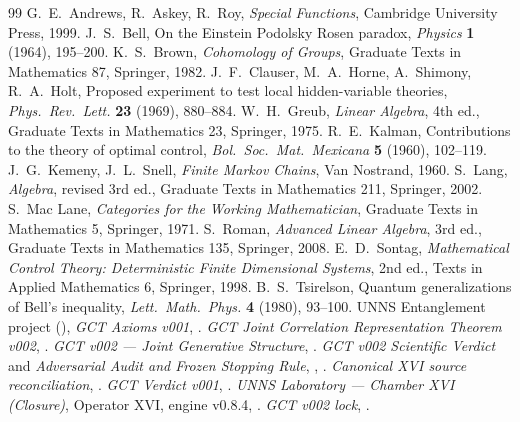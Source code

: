 \documentclass[11pt,a4paper]{article}
\theoremstyle{plain}
\theoremstyle{definition}
\begin{document}
\begin{thebibliography}{99}\small
 G.~E.~Andrews, R.~Askey, R.~Roy, \emph{Special Functions}, Cambridge University Press, 1999.
 J.~S.~Bell, On the Einstein Podolsky Rosen paradox, \emph{Physics} \textbf{1} (1964), 195--200.
 K.~S.~Brown, \emph{Cohomology of Groups}, Graduate Texts in Mathematics 87, Springer, 1982.
 J.~F.~Clauser, M.~A.~Horne, A.~Shimony, R.~A.~Holt, Proposed experiment to test local hidden-variable theories, \emph{Phys.\ Rev.\ Lett.} \textbf{23} (1969), 880--884.
 W.~H.~Greub, \emph{Linear Algebra}, 4th ed., Graduate Texts in Mathematics 23, Springer, 1975.
 R.~E.~Kalman, Contributions to the theory of optimal control, \emph{Bol.\ Soc.\ Mat.\ Mexicana} \textbf{5} (1960), 102--119.
 J.~G.~Kemeny, J.~L.~Snell, \emph{Finite Markov Chains}, Van Nostrand, 1960.
 S.~Lang, \emph{Algebra}, revised 3rd ed., Graduate Texts in Mathematics 211, Springer, 2002.
 S.~Mac Lane, \emph{Categories for the Working Mathematician}, Graduate Texts in Mathematics 5, Springer, 1971.
 S.~Roman, \emph{Advanced Linear Algebra}, 3rd ed., Graduate Texts in Mathematics 135, Springer, 2008.
 E.~D.~Sontag, \emph{Mathematical Control Theory: Deterministic Finite Dimensional Systems}, 2nd ed., Texts in Applied Mathematics 6, Springer, 1998.
 B.~S.~Tsirelson, Quantum generalizations of Bell's inequality, \emph{Lett.\ Math.\ Phys.} \textbf{4} (1980), 93--100.
\medskip
{} UNNS Entanglement project (), \emph{GCT Axioms v001}, .
 \emph{GCT Joint Correlation Representation Theorem v002}, .
 \emph{GCT v002 --- Joint Generative Structure}, .
 \emph{GCT v002 Scientific Verdict} and \emph{Adversarial Audit and Frozen Stopping Rule}, , .
 \emph{Canonical XVI source reconciliation}, .
 \emph{GCT Verdict v001}, .
 \emph{UNNS Laboratory --- Chamber XVI (Closure)}, Operator XVI, engine v0.8.4, .
 \emph{GCT v002 lock}, .

\end{thebibliography}
\end{document}
